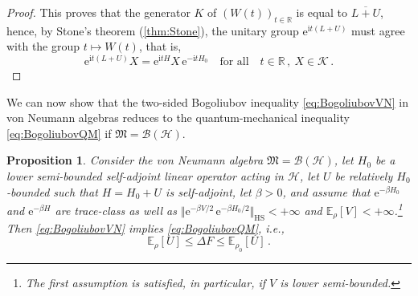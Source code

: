 \documentclass[a4paper, twoside, 11pt, reqno]{amsart}
\theoremstyle{definition}
\theoremstyle{plain}
\newtheorem{proposition}[definition]{Proposition}
\renewcommand{\Delta}{\varDelta}
\newcommand{\R}{\mathbb{R}}
\newcommand{\MH}{\mathcal{H}}
\newcommand{\MK}{\mathcal{K}}
\newcommand{\MFM}{\mathfrak{M}}
\newcommand{\ii}{\mathrm{i}}
\newcommand{\ee}{\mathrm{e}}
\newcommand{\BO}{\mathscr{B}}
\newcommand{\1}{\mathbf{1}}
\newcommand{\EV}{\mathbb{E}}
\newcommand{\norm}[2][]{#1\Vert{#2}#1\Vert}
\newcommand{\oln}[1]{\overline{#1}}
\begin{document}
\begin{proof}
    This proves that the generator $K$ of $(W(t))_{t \in \R}$ is equal to $\oln{L + U}$, hence, by Stone's theorem (\cref{thm:Stone}), the unitary group $\ee^{\ii t (L + U)}$ must agree with the group $t \mapsto W(t)$, that is,
    \begin{equation*}
        \ee^{\ii t (L + U)} X = \ee^{\ii t H} X \, \ee^{- \ii t H_0} \quad \text{for all} \quad t \in \R \, , \ X \in \MK \, . \tag*{\qedhere}
    \end{equation*}
\end{proof}

We can now show that the two-sided Bogoliubov inequality \eqref{eq:BogoliubovVN} in von Neumann algebras reduces to the quantum-mechanical inequality \eqref{eq:BogoliubovQM} if $\MFM = \BO(\MH)$.

\begin{proposition}\label{pro:BogoliubovVNimpliesQM}
    Consider the von Neumann algebra $\MFM = \BO(\MH)$, let $H_0$ be a lower semi-bounded self-adjoint linear operator acting in $\MH$, let $U$ be relatively $H_0$-bounded such that $H = H_0 + U$ is self-adjoint, let $\beta > 0$, and assume that $\ee^{- \beta H_0}$ and $\ee^{- \beta H}$ are trace-class as well as $\norm{\ee^{- \beta V / 2} \, \ee^{- \beta H_0 / 2}}_\mathrm{HS} < + \infty$ and $\EV_\rho [V] < + \infty$.\footnote{The first assumption is satisfied, in particular, if $V$ is lower semi-bounded.} Then \cref{eq:BogoliubovVN} implies \cref{eq:BogoliubovQM}, i.e.,
    \begin{equation*}
        \EV_\rho[U] \le \Delta F \le \EV_{\rho_0}[U] \, .
    \end{equation*}
\end{proposition}
\end{document}
